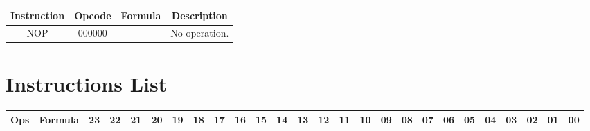 \documentclass[a4paper,10pt]{article}
\begin{document}
\begin{center}
    \begin{tabularx}{\textwidth}{|c|c|c|X|} \hline
      Instruction & Opcode & Formula & \multicolumn{1}{c|}{Description} \\ \hline \hline
      NOP & 000000 & --- & No operation.  \\ \hline
    \end{tabularx}
\end{center}

\section{Instructions List}

\begin{landscape}\begin{longtable}[c]{|c|c|@{}c@{}|@{}c@{}|@{}c@{}|@{}c@{}|@{}c@{}|@{}c@{}|@{}c@{}|@{}c@{}|@{}c@{}|@{}c@{}|@{}c@{}|@{}c@{}|@{}c@{}|@{}c@{}|@{}c@{}|@{}c@{}|@{}c@{}|@{}c@{}|@{}c@{}|@{}c@{}|@{}c@{}|@{}c@{}|@{}c@{}|@{}c@{}|}\hline
Ops                   & Formula                                                            & 23  & 22  & 21  & 20  & 19      & 18      & 17     & 16    & 15       & 14     & 13     & 12    & 11     & 10   & 09    & 08    & 07                & 06                & 05   & 04   & 03   & 02 & 01 & 00 \\\hline



\end{longtable}
\end{landscape}
\end{document}

